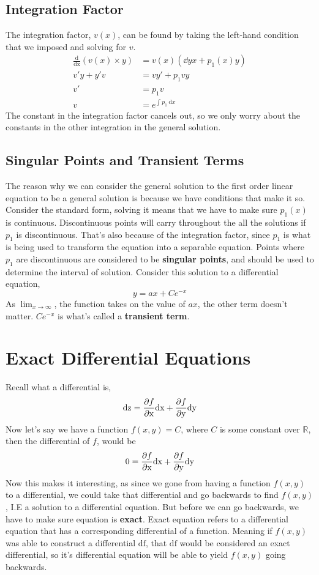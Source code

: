 \subsection{Integration Factor}
The integration factor, $v(x)$, can be found by taking the left-hand condition that we imposed and solving for $v$.
\begin{align*}	
	\frac{\mathrm{d}}{\mathrm{dx}} (v(x) \times y) &= v(x)(\dd{y}{x}+p_1(x)y) \\ 
	v'y+y'v &= vy' + p_1vy \\ 
	v' &= p_1v \\ 
	v &= e^{\int p_1 \: \mathrm{d}x}
\end{align*}
The constant in the integration factor cancels out, so we only worry about the constants in the other integration in the general solution.
\subsection{Singular Points and Transient Terms}
The reason why we can consider the general solution to the first order linear equation to be a general solution is because we have conditions that make it so. Consider the standard form, solving it means that we have to make sure $p_1(x)$ is continuous. Discontinuous points will carry throughout the all the solutions if $p_1$ is discontinuous. That's also because of the integration factor, since $p_1$ is what is being used to transform the equation into a separable equation. Points where $p_1$ are discontinuous are considered to be \textbf{singular points}, and should be used to determine the interval of solution.
Consider this solution to a differential equation, 
\begin{equation*}
	y = ax + Ce^{-x}
\end{equation*} 
As $\lim_{x\to\infty}$, the function takes on the value of $ax$, the other term doesn't matter. 
$Ce^{-x}$ is what's called a \textbf{transient term}. 

\pagebreak
\section{Exact Differential Equations}
Recall what a differential is, 
\begin{equation*}
	\mathrm{dz} = \frac{\partial f}{\partial\mathrm{x}}\mathrm{dx}+\frac{\partial f}{\partial\mathrm{y}}\mathrm{dy}
\end{equation*}
Now let's say we have a function $f(x,y) = C$, where $C$ is some constant over $\mathbb{R}$, then the differential of $f$, would be 
\begin{equation*}
	0 = \frac{\partial f}{\partial\mathrm{x}}\mathrm{dx}+\frac{\partial f}{\partial\mathrm{y}}\mathrm{dy}
\end{equation*}
Now this makes it interesting, as since we gone from having a function $f(x,y)$ to a differential, we could take that differential and go backwards to find $f(x,y)$, I.E a solution to a differential equation. But before we can go backwards, we have to make sure equation is \textbf{exact}. Exact equation refers to a differential equation that has a corresponding differential of a function. Meaning if $f(x,y)$ was able to construct a differential $\mathrm{df}$, that $\mathrm{df}$ would be considered an exact differential, so it's differential equation will be able to yield $f(x,y)$ going backwards.
